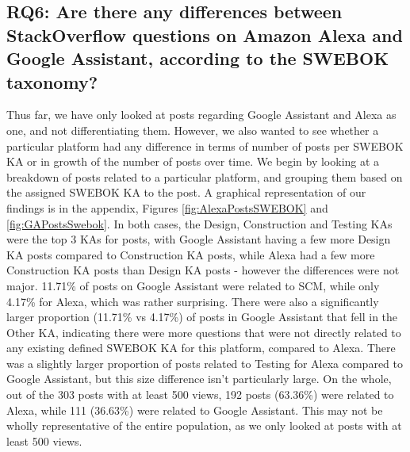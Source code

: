 \documentclass{sigchi}
\begin{document}
\subsection{RQ6: Are there any differences between StackOverflow questions on Amazon Alexa and Google Assistant, according to the SWEBOK taxonomy?}
Thus far, we have only looked at posts regarding Google Assistant and Alexa as one, and not differentiating them. However, we also wanted to see whether a particular platform had any difference in terms of number of posts per SWEBOK KA or in growth of the number of posts over time. We begin by looking at a breakdown of posts related to a particular platform, and grouping them based on the assigned SWEBOK KA to the post. A graphical representation of our findings is in the appendix, Figures \ref{fig:AlexaPostsSWEBOK} and \ref{fig:GAPostsSwebok}. In both cases, the Design, Construction and Testing KAs were the top 3 KAs for posts, with Google Assistant having a few more Design KA posts compared to Construction KA posts, while Alexa had a few more Construction KA posts than Design KA posts - however the differences were not major. 11.71\% of posts on Google Assistant were related to SCM, while only 4.17\% for Alexa, which was rather surprising. There were also a significantly larger proportion (11.71\% vs 4.17\%) of posts in Google Assistant that fell in the Other KA, indicating there were more questions that were not directly related to any existing defined SWEBOK KA for this platform, compared to Alexa. There was a slightly larger proportion of posts related to Testing for Alexa compared to Google Assistant, but this size difference isn't particularly large. On the whole, out of the 303 posts with at least 500 views, 192 posts (63.36\%) were related to Alexa, while 111 (36.63\%) were related to Google Assistant. This may not be wholly representative of the entire population, as we only looked at posts with at least 500 views. 
\end{document}

